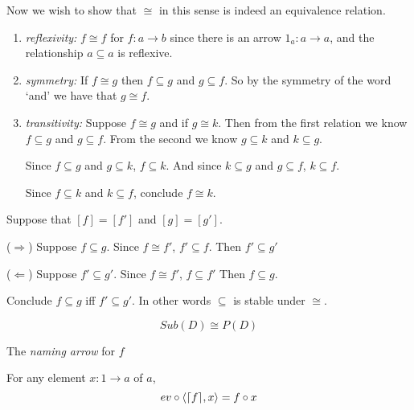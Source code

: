     \begin{exercise}
        Now we wish to show that $\cong$ in this sense is indeed an equivalence relation.
        \begin{enumerate}
            \item \emph{reflexivity: } $f \cong f$ for $f : a \to b$ since there is an arrow $1_a : a \to a$, and the relationship $a \subseteq a$ is reflexive.

            \item \emph{symmetry: } If $f \cong g$ then $f \subseteq g$ and $g \subseteq f$. So by the symmetry of the word `and' we have that $g \cong f$.

            \item \emph{transitivity: } Suppose $f \cong g$ and if $g \cong k$. Then from the first relation we know $f \subseteq g$ and $g \subseteq f$.  From the second we know $g \subseteq k$ and $k \subseteq g$.

            Since $f \subseteq g$ and $g \subseteq k$, $f \subseteq k$.
            And since $k \subseteq g$ and $g \subseteq f$, $k \subseteq f$.

            Since $f \subseteq k$ and $k \subseteq f$, conclude $f \cong k$.
        \end{enumerate}
    \end{exercise}

    \begin{exercise}
        Suppose that $[f] = [f']$ and $[g] = [g']$.

        ($\Rightarrow$) Suppose $f \subseteq g$.
        Since $f \cong f'$, $f' \subseteq f$.
        Then $f' \subseteq g'$
        
        ($\Leftarrow$) Suppose $f' \subseteq g'$.
        Since $f \cong f'$, $f \subseteq f'$
        Then $f \subseteq g$.
        
        Conclude $f \subseteq g$ iff $f' \subseteq g'$. In other words $\subseteq$ is stable under $\cong$.
    \end{exercise}

    \begin{exercise}
        $$Sub(D) \cong P(D)$$
    \end{exercise}

    \begin{defi}
        The \emph{naming arrow} for $f$
    \end{defi}

    \begin{exercise}
        For any element $x : 1 \to a$ of $a$,
        $$ev \circ \langle \lceil f \rceil, x \rangle = f \circ x$$
    \end{exercise}


